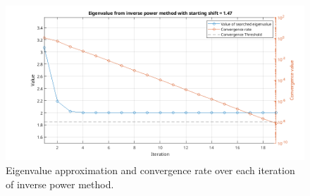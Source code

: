 \begin{figure}
    \centering
    \includegraphics[width=1\textwidth]{problems/Figures/Problem2InversePowerMethod.png}
    \caption{Eigenvalue approximation and convergence rate over each iteration of inverse power method.}
    \label{fig:Inverse}
\end{figure}
